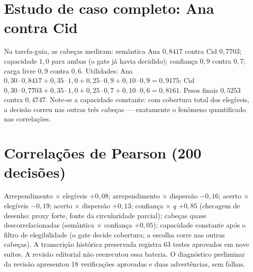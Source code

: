 \section{Estudo de caso completo: Ana contra Cid}
Na tarefa-guia, as cabeças mediram: semântica Ana $0{,}8417$ contra Cid $0{,}7703$; capacidade $1{,}0$ para ambas (o gate já havia decidido); confiança $0{,}9$ contra $0{,}7$; carga livre $0{,}9$ contra $0{,}6$. Utilidades: Ana $0{,}30\cdot0{,}8417+0{,}35\cdot1{,}0+0{,}25\cdot0{,}9+0{,}10\cdot0{,}9=0{,}9175$; Cid $0{,}30\cdot0{,}7703+0{,}35\cdot1{,}0+0{,}25\cdot0{,}7+0{,}10\cdot0{,}6=0{,}8161$. Pesos finais $0{,}5253$ contra $0{,}4747$. Note-se a capacidade constante: com cobertura total dos elegíveis, a decisão correu nas outras três cabeças --- exatamente o fenômeno quantificado nas correlações.
\section{Correlações de Pearson (200 decisões)}
Arrependimento $\times$ elegíveis $+0{,}08$; arrependimento $\times$ dispersão $-0{,}16$; acerto $\times$ elegíveis $-0{,}19$; acerto $\times$ dispersão $+0{,}13$; confiança $\times$ $q$ $+0{,}85$ (checagem de desenho: proxy forte, fonte da circularidade parcial); cabeças quase descorrelacionadas (semântica $\times$ confiança $+0{,}05$); capacidade constante após o filtro de elegibilidade (o gate decide cobertura; a escolha corre nas outras cabeças). A transcrição histórica preservada registra 63 testes aprovados em nove suítes. A revisão editorial não reexecutou essa bateria. O diagnóstico preliminar da revisão apresentou 18 verificações aprovadas e duas advertências, sem falhas.
